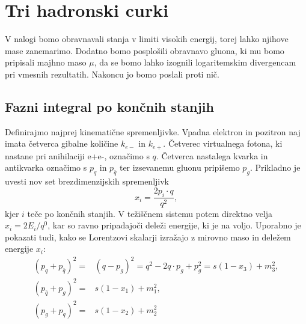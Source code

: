 \documentclass[11pt]{article}
\begin{document}













\section{Tri hadronski curki}
V nalogi bomo obravnavali stanja v limiti visokih energij, torej lahko njihove mase zanemarimo.
Dodatno bomo posplošili obravnavo gluona, ki mu bomo pripisali majhno maso $\mu$, da se bomo lahko izognili logaritemskim divergencam pri vmesnih rezultatih.
Nakoncu jo bomo poslali proti nič.



\subsection{Fazni integral po končnih stanjih}
Definirajmo najprej kinematične spremenljivke.
Vpadna elektron in pozitron naj imata četverca gibalne količine $k_{e-}$ in $k_{e+}$.
Četverec virtualnega fotona, ki nastane pri anihilaciji e+e-, označimo s $q$.
Četverca nastalega kvarka in antikvarka označimo s $p_q$ in $p_{\bar{q}}$ ter izsevanemu gluonu pripišemo $p_g$.
Prikladno je uvesti nov set brezdimenzijskih spremenljivk
\begin{equation}
       x_i = \frac{2 p_i \cdot q}{q^2},
\end{equation}
kjer $i$ teče po končnih stanjih.
V težiščnem sistemu potem direktno velja $x_i = 2E_i/q^0$, kar so ravno pripadajoči deleži energije, ki je na voljo.
Uporabno je pokazati tudi, kako se Lorentzovi skalarji izražajo z mirovno maso in deležem energije $x_i$:
\begin{equation}
       \begin{split}
              (p_q + p_{\bar{q}})^2 =& (q - p_g)^2 = q^2 - 2 q \cdot p_g + p_g^2 = s (1-x_3) + m_3^2, \\
              (p_{\bar{q}} + p_g)^2 =& s(1-x_1) + m_1^2, \\
              (p_g + p_q)^2 =& s(1-x_2) + m_2^2
       \end{split}
       \label{eq:pokazi}
\end{equation}
\end{document}
